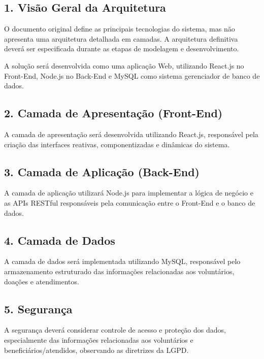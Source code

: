 \documentclass[12pt,a4paper]{article}
\begin{document}
\subsection*{1. Visão Geral da Arquitetura}

O documento original define as principais tecnologias do sistema, mas
não apresenta uma arquitetura detalhada em camadas. A arquitetura
definitiva deverá ser especificada durante as etapas de modelagem e
desenvolvimento.

A solução será desenvolvida como uma aplicação Web, utilizando React.js
no Front-End, Node.js no Back-End e MySQL como sistema gerenciador de
banco de dados.

\subsection*{2. Camada de Apresentação (Front-End)}

A camada de apresentação será desenvolvida utilizando React.js,
responsável pela criação das interfaces reativas, componentizadas e
dinâmicas do sistema.

\subsection*{3. Camada de Aplicação (Back-End)}

A camada de aplicação utilizará Node.js para implementar a lógica de
negócio e as APIs RESTful responsáveis pela comunicação entre o
Front-End e o banco de dados.

\subsection*{4. Camada de Dados}

A camada de dados será implementada utilizando MySQL, responsável pelo
armazenamento estruturado das informações relacionadas aos voluntários,
doações e atendimentos.

\subsection*{5. Segurança}

A segurança deverá considerar controle de acesso e proteção dos dados,
especialmente das informações relacionadas aos voluntários e
beneficiários/atendidos, observando as diretrizes da LGPD.

\end{document}
